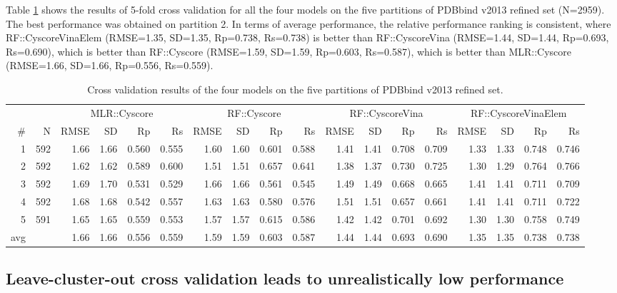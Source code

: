 Table \ref{rfcyscore:cv} shows the results of 5-fold cross validation for all the four models on the five partitions of PDBbind v2013 refined set (N=2959). The best performance was obtained on partition 2. In terms of average performance, the relative performance ranking is consistent, where RF::CyscoreVinaElem (RMSE=1.35, SD=1.35, Rp=0.738, Rs=0.738) is better than RF::CyscoreVina (RMSE=1.44, SD=1.44, Rp=0.693, Rs=0.690), which is better than RF::Cyscore (RMSE=1.59, SD=1.59, Rp=0.603, Rs=0.587), which is better than MLR::Cyscore (RMSE=1.66, SD=1.66, Rp=0.556, Rs=0.559).

\begin{table}
\caption{Cross validation results of the four models on the five partitions of PDBbind v2013 refined set.}
\label{rfcyscore:cv}
\begin{tabular}{rrrrrrrrrrrrrrrrrr}
\hline
&&\multicolumn{4}{c}{MLR::Cyscore} & \multicolumn{4}{c}{RF::Cyscore} & \multicolumn{4}{c}{RF::CyscoreVina} & \multicolumn{4}{c}{RF::CyscoreVinaElem}\\
\# & N & RMSE & SD & Rp & Rs & RMSE & SD & Rp & Rs & RMSE & SD & Rp & Rs & RMSE & SD & Rp & Rs\\
\hline
  1 & 592 & 1.66 & 1.66 & 0.560 & 0.555 & 1.60 & 1.60 & 0.601 & 0.588 & 1.41 & 1.41 & 0.708 & 0.709 & 1.33 & 1.33 & 0.748 & 0.746\\
  2 & 592 & 1.62 & 1.62 & 0.589 & 0.600 & 1.51 & 1.51 & 0.657 & 0.641 & 1.38 & 1.37 & 0.730 & 0.725 & 1.30 & 1.29 & 0.764 & 0.766\\
  3 & 592 & 1.69 & 1.70 & 0.531 & 0.529 & 1.66 & 1.66 & 0.561 & 0.545 & 1.49 & 1.49 & 0.668 & 0.665 & 1.41 & 1.41 & 0.711 & 0.709\\
  4 & 592 & 1.68 & 1.68 & 0.542 & 0.557 & 1.63 & 1.63 & 0.580 & 0.576 & 1.51 & 1.51 & 0.657 & 0.661 & 1.41 & 1.41 & 0.711 & 0.722\\
  5 & 591 & 1.65 & 1.65 & 0.559 & 0.553 & 1.57 & 1.57 & 0.615 & 0.586 & 1.42 & 1.42 & 0.701 & 0.692 & 1.30 & 1.30 & 0.758 & 0.749\\
avg &     & 1.66 & 1.66 & 0.556 & 0.559 & 1.59 & 1.59 & 0.603 & 0.587 & 1.44 & 1.44 & 0.693 & 0.690 & 1.35 & 1.35 & 0.738 & 0.738\\
\hline
\end{tabular}
\end{table}

\subsection{Leave-cluster-out cross validation leads to unrealistically low performance}

